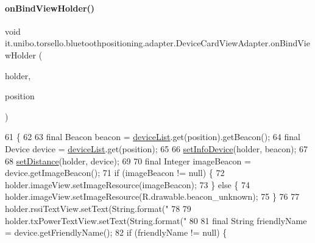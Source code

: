 \paragraph{\texorpdfstring{on\+Bind\+View\+Holder()}{onBindViewHolder()}}
{\footnotesize\ttfamily void it.\+unibo.\+torsello.\+bluetoothpositioning.\+adapter.\+Device\+Card\+View\+Adapter.\+on\+Bind\+View\+Holder (\begin{DoxyParamCaption}\item[{\hyperlink{classit_1_1unibo_1_1torsello_1_1bluetoothpositioning_1_1adapter_1_1DeviceCardViewAdapter_1_1DeviceViewHolder}{Device\+View\+Holder}}]{holder,  }\item[{final int}]{position }\end{DoxyParamCaption})}


\begin{DoxyCode}
61                                                                               \{
62 
63         \textcolor{keyword}{final} Beacon beacon = \hyperlink{classit_1_1unibo_1_1torsello_1_1bluetoothpositioning_1_1adapter_1_1DeviceCardViewAdapter_a72413f87c723c585bd1ad9bc5711cf39_a72413f87c723c585bd1ad9bc5711cf39}{deviceList}.get(position).getBeacon();
64         \textcolor{keyword}{final} Device device = \hyperlink{classit_1_1unibo_1_1torsello_1_1bluetoothpositioning_1_1adapter_1_1DeviceCardViewAdapter_a72413f87c723c585bd1ad9bc5711cf39_a72413f87c723c585bd1ad9bc5711cf39}{deviceList}.get(position);
65 
66         \hyperlink{classit_1_1unibo_1_1torsello_1_1bluetoothpositioning_1_1adapter_1_1DeviceCardViewAdapter_aa43ee1f594b3489f6e9e4b8e20ea1612_aa43ee1f594b3489f6e9e4b8e20ea1612}{setInfoDevice}(holder, beacon);
67 
68         \hyperlink{classit_1_1unibo_1_1torsello_1_1bluetoothpositioning_1_1adapter_1_1DeviceCardViewAdapter_a8d5baa2d386a92ba4fb20b71e6e517f9_a8d5baa2d386a92ba4fb20b71e6e517f9}{setDistance}(holder, device);
69 
70         \textcolor{keyword}{final} Integer imageBeacon = device.getImageBeacon();
71         \textcolor{keywordflow}{if} (imageBeacon != null) \{
72             holder.imageView.setImageResource(imageBeacon);
73         \} \textcolor{keywordflow}{else} \{
74             holder.imageView.setImageResource(R.drawable.beacon\_unknown);
75         \}
76 
77         holder.rssiTextView.setText(String.format(\textcolor{stringliteral}{"%
78 
79         holder.txPowerTextView.setText(String.format(\textcolor{stringliteral}{"%
80 
81         \textcolor{keyword}{final} String friendlyName = device.getFriendlyName();
82         \textcolor{keywordflow}{if} (friendlyName != null) \{
}}
\end{DoxyCode}
